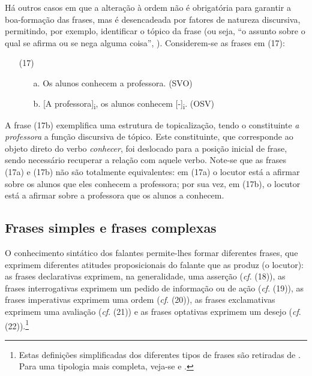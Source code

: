 \documentclass[output=paper,colorlinks,citecolor=brown,booklanguage=portuguese]{langscibook}
\begin{document}
Há outros casos em que a alteração à ordem não é obrigatória para garantir a boa-formação das frases, mas é desencadeada por fatores de natureza discursiva, permitindo, por exemplo, identificar o tópico da frase (ou seja, “o assunto sobre o qual se afirma ou se nega alguma coisa”, \citealp[149]{Duarte2000}). Considerem-se as frases em (17):

\begin{enumerate}[align=left]
    \item [(17)]
    \begin{enumerate}
        \item [a.] Os alunos conhecem a professora. (SVO)
	\item[b.] [A professora]\textsubscript{i}, os alunos conhecem [-]\textsubscript{i}.  (OSV) 
    \end{enumerate}
\end{enumerate}

A frase (17b) exemplifica uma estrutura de topicalização, tendo o constituinte \emph{a professora} a função discursiva de tópico. Este constituinte, que corresponde ao objeto direto do verbo \emph{conhecer}, foi deslocado para a posição inicial de frase, sendo necessário recuperar a relação com aquele verbo. Note-se que as frases (17a) e (17b) não são totalmente equivalentes: em (17a) o locutor está a afirmar sobre os alunos que eles conhecem a professora; por sua vez, em (17b), o locutor está a afirmar sobre a professora que os alunos a conhecem. 

\subsection{Frases simples e frases complexas}\label{sec:doispontoquatro}
O conhecimento sintático dos falantes permite-lhes formar diferentes frases, que exprimem diferentes atitudes proposicionais do falante que as produz (o locutor): as frases declarativas exprimem, na generalidade, uma asserção (\emph{cf}. (18)), as frases interrogativas exprimem um pedido de informação ou de ação (\emph{cf}. (19)), as frases imperativas exprimem uma ordem (\emph{cf}. (20)), as frases exclamativas exprimem uma avaliação (\emph{cf}. (21)) e as frases optativas exprimem um desejo (\emph{cf}. (22)).\footnote{Estas definições simplificadas dos diferentes tipos de frases são retiradas de \citet{Duarte2000}. Para uma tipologia mais completa, veja-se \citet[433-506]{Brito2003} e \citet{Barbosa2020}.}
\end{document}
